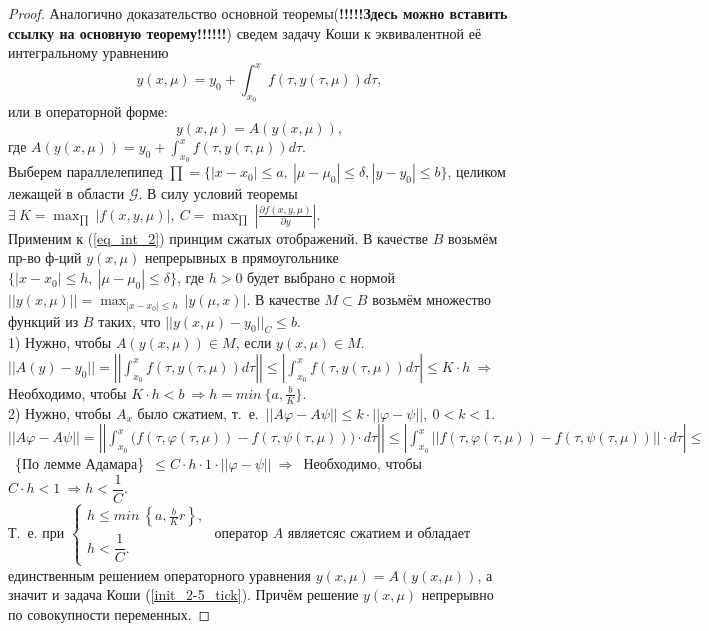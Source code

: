 	\begin{proof}
	    Аналогично доказательство основной теоремы(\textbf{!!!!!Здесь можно вставить ссылку на основную теорему!!!!!!}) сведем задачу Коши к эквивалентной её интегральному уравнению 
	    \begin{equation}\label{eq_int_1}
	        y(x, \mu) = y_0 + \int_{x_0}^{x} f(\tau, y(\tau, \mu)) d\tau,
	    \end{equation}
	    или в операторной форме:
	    \begin{equation}\label{eq_int_2}
	        y(x, \mu) = A(y(x, \mu)),
	    \end{equation}
	    где $\displaystyle A(y(x, \mu)) = y_0 + \int_{x_0}^{x} f(\tau, y(\tau, \mu)) d\tau$.\\
	    Выберем параллелепипед $\prod = \{ |x - x_0| \leq a,\ |\mu - \mu_0| \leq \delta, |y - y_0| \leq b\}$, целиком лежащей в области $\mathcal{G}$. В силу условий теоремы $\displaystyle \exists\ K = \max_{\prod \ }|f(x, y, \mu)|,\ C = \max_{\prod \ } \left| \frac{\partial f(x, y, \mu)}{\partial y} \right|$.\\ 
	    Применим к (\ref{eq_int_2}) принцим сжатых отображений. В качестве $B$ возьмём пр-во ф-ций $y(x, \mu)$ непрерывных в прямоугольнике $\{|x - x_0| \leq h,\ |\mu - \mu_0| \leq \delta\}$, где $h > 0$ будет выбрано с нормой $\displaystyle||y(x, \mu)|| = \max_{|x - x_0| \leq h\ } |y (\mu, x)|$. В качестве $M \subset B$ возьмём множество функций из $B$ таких, что $||y(x, \mu) - y_0||_C \leq b$.\\
	    1) Нужно, чтобы $A(y(x, \mu)) \in M$, если $y(x, \mu) \in M$. $||A(y) - y_0|| = \left|\left|\displaystyle \int_{x_0}^{x} f(\tau, y(\tau, \mu)) d\tau \right|\right| \leq \displaystyle \left|\int_{x_0}^{x} f(\tau, y(\tau, \mu)) d\tau\right| \leq K \cdot h\ \Rightarrow$ Необходимо, чтобы $K\cdot h < b\ \Rightarrow h = min\ \{a, \frac{b}{K}\}$. \\
	    2) Нужно, чтобы $A_x$ было сжатием, т.\ е.\ $||A\varphi - A\psi|| \leq k \cdot ||\varphi - \psi||,\ 0 < k < 1$. \\
	    $||A\varphi - A\psi|| = \left|\left|\displaystyle\int_{x_0}^{x} \Big( f(\tau, \varphi(\tau, \mu)) - f(\tau, \psi(\tau, \mu)) \Big) \cdot d\tau \right|\right| \leq \left|\displaystyle \int_{x_0}^{x} ||f(\tau, \varphi(\tau, \mu)) - f(\tau, \psi(\tau, \mu))|| \cdot d\tau \right| \leq $\ \{По лемме Адамара\}\ $ \leq C\cdot h\cdot 1\cdot ||\varphi - \psi||\ \Rightarrow$\ Необходимо, чтобы $C\cdot h < 1\ \Rightarrow h < \dfrac{1}{C}$.\\
	    Т.\ е. при 
	    $\begin{cases} 
            h \leq min ~ \left \{a, \frac{b}{K}r \right \}, \\
            h < \dfrac{1}{C}. 
        \end{cases}$
        оператор $A$ являетсяс сжатием и обладает единственным решением операторного уравнения $y(x, \mu) = A(y(x, \mu))$, а значит и задача Коши (\ref{init_2-5_tick}). Причём решение $y(x, \mu)$ непрерывно по совокупности переменных.
	\end{proof}
